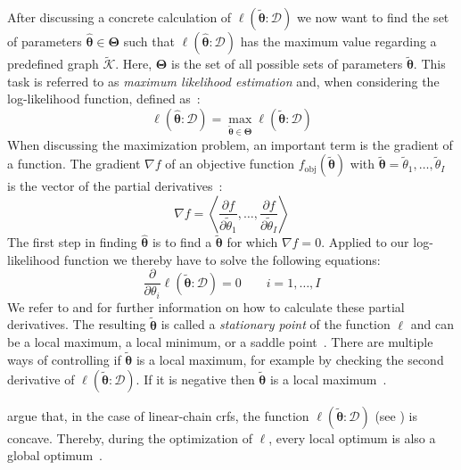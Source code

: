 After discussing a concrete calculation of $\ell(\bm{\tilde{\theta}}:\mathcal{D})$ we now want to find the set of parameters $\bm{\hat{\theta}}\in\mathbf{\Theta}$ such that $\ell(\bm{\hat{\theta}}:\mathcal{D})$ has the maximum value regarding a predefined graph $\mathcal{\tilde{K}}$.
Here, $\bm{\Theta}$ is the set of all possible sets of parameters $\bm{\tilde{\theta}}$.
This task is referred to as \textit{maximum likelihood estimation} and, when considering the log-likelihood function, defined as~\citep{koller2009probabilistic}:
\begin{equation}
  \label{equ:maximum-log-likelihood-estimation}
  \ell\left(\bm{\hat{\theta}}:\mathcal{D}\right)=\max_{\bm{\tilde{\theta}}\in\mathbf{\Theta}}\ell\left(\bm{\tilde{\theta}}:\mathcal{D}\right)
\end{equation}
When discussing the maximization problem, an important term is the \gls{gradient} of a \gls{function}.
The \gls{gradient} $\nabla f$ of an \gls{objective function} $f_{\text{obj}}(\bm{\tilde{\theta}})$ with $\bm{\tilde{\theta}}=\tilde{\theta}_1,\dots,\tilde{\theta}_I$ is the vector of the partial derivatives~\citep{koller2009probabilistic}:
\begin{equation}
  \label{equ:gradient}
  \nabla f=\left\langle\frac{\partial f}{\partial\tilde{\theta}_1},\dots,\frac{\partial f}{\partial\tilde{\theta}_I}\right\rangle
\end{equation}
The first step in finding $\bm{\hat{\theta}}$ is to find a $\bm{\tilde{\theta}}$ for which $\nabla f=0$.
Applied to our log-likelihood function we thereby have to solve the following equations:
\begin{equation}
  \label{equ:log-likelihood-gradient}
  \frac{\partial}{\partial\theta_i}\ell\left(\bm{\tilde{\theta}}:\mathcal{D}\right)=0\ \ \ \ \ \ \ \ \ i=1,\dots,I
\end{equation}
We refer to \citet{sutton2010introduction} and \citet{koller2009probabilistic} for further information on how to calculate these partial derivatives.
The resulting $\bm{\tilde{\theta}}$ is called a \textit{stationary point} of the function $\ell$ and can be a local maximum, a local minimum, or a saddle point~\citep{koller2009probabilistic}.
There are multiple ways of controlling if $\bm{\tilde{\theta}}$ is a local maximum, for example by checking the second derivative of $\ell(\bm{\tilde{\theta}}:\mathcal{D})$.
If it is negative then $\bm{\tilde{\theta}}$ is a local maximum~\citep{koller2009probabilistic}.

\citep{sutton2010introduction} argue that, in the case of \glspl{linear-chain crf}, the function $\ell(\bm{\tilde{\theta}}:\mathcal{D})$ (see ) is concave.
Thereby, during the optimization of $\ell$, every local optimum is also a global optimum~\citep{sutton2010introduction}.

